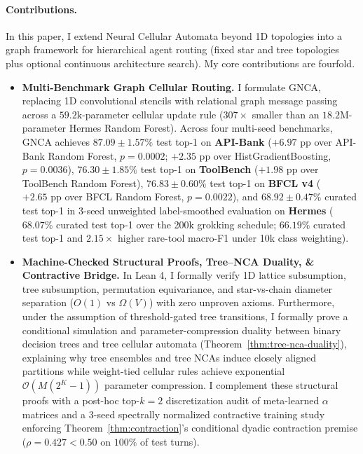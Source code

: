 \documentclass[10pt,twocolumn,letterpaper]{article}
\begin{document}
\paragraph{Contributions.} In this paper, I extend Neural Cellular Automata beyond 1D topologies into a graph framework for hierarchical agent routing (fixed star and tree topologies plus optional continuous architecture search). My core contributions are fourfold.
\begin{itemize}[leftmargin=1.5em, itemsep=0.1em]
  \item \textbf{Multi-Benchmark Graph Cellular Routing.} I formulate GNCA, replacing 1D convolutional stencils with relational graph message passing across a $59.2\text{k}$-parameter cellular update rule ($307\times$ smaller than an $18.2\text{M}$-parameter Hermes Random Forest). Across four multi-seed benchmarks, GNCA achieves $\mathbf{87.09 \pm 1.57\%}$ test top-1 on \textbf{API-Bank} ($+6.97\text{ pp}$ over API-Bank Random Forest, $p=0.0002$; $+2.35\text{ pp}$ over HistGradientBoosting, $p=0.0036$), $\mathbf{76.30 \pm 1.85\%}$ test top-1 on \textbf{ToolBench} ($+1.98\text{ pp}$ over ToolBench Random Forest), $\mathbf{76.83 \pm 0.60\%}$ test top-1 on \textbf{BFCL v4} ($+2.65\text{ pp}$ over BFCL Random Forest, $p=0.0022$), and $\mathbf{68.92 \pm 0.47\%}$ curated test top-1 in 3-seed unweighted label-smoothed evaluation on \textbf{Hermes} ($68.07\%$ curated test top-1 over the 200k grokking schedule; $66.19\%$ curated test top-1 and $2.15\times$ higher rare-tool macro-F1 under 10k class weighting).
  \item \textbf{Machine-Checked Structural Proofs, Tree--NCA Duality, \& Contractive Bridge.} In Lean 4, I formally verify 1D lattice subsumption, tree subsumption, permutation equivariance, and star-vs-chain diameter separation ($O(1)$ vs $\Omega(V)$) with zero unproven axioms. Furthermore, under the assumption of threshold-gated tree transitions, I formally prove a conditional simulation and parameter-compression duality between binary decision trees and tree cellular automata (Theorem~\ref{thm:tree-nca-duality}), explaining why tree ensembles and tree NCAs induce closely aligned partitions while weight-tied cellular rules achieve exponential $\mathcal{O}(M(2^K-1))$ parameter compression. I complement these structural proofs with a post-hoc top-$k=2$ discretization audit of meta-learned $\alpha$ matrices and a 3-seed spectrally normalized contractive training study enforcing Theorem~\ref{thm:contraction}'s conditional dyadic contraction premise ($\rho = 0.427 < 0.50$ on $100\%$ of test turns).

\end{itemize}
\end{document}
